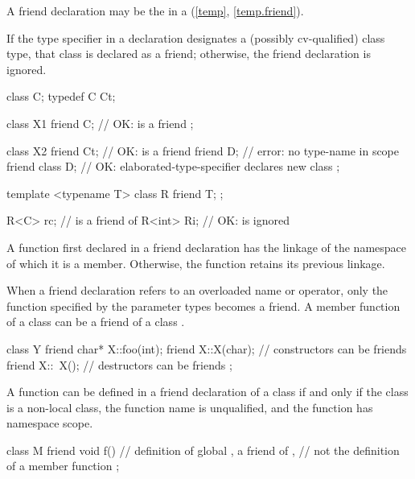 \begin{note}
A friend declaration may be the
 in a 
(\ref{temp}, \ref{temp.friend}).
\end{note}
If the
type specifier in a  declaration designates a (possibly
cv-qualified) class type, that class is declared as a friend; otherwise, the
friend declaration is ignored.
\begin{example}
\begin{codeblock}
class C;
typedef C Ct;

class X1 {
  friend C;                     // OK:  is a friend
};

class X2 {
  friend Ct;                    // OK:  is a friend
  friend D;                     // error: no type-name  in scope
  friend class D;               // OK: elaborated-type-specifier declares new class
};

template <typename T> class R {
  friend T;
};

R<C> rc;                        //  is a friend of 
R<int> Ri;                      // OK:  is ignored
\end{codeblock}
\end{example}

\pnum
{}%
A function first declared in a friend declaration
has the linkage of the namespace of which it is a member.
Otherwise, the function retains its previous linkage.

\pnum
{}%
When a friend
declaration refers to an overloaded name or operator, only the function specified
by the parameter types becomes a friend.
A member function of a class
can be a friend of
a class
.
%
\begin{example}
\begin{codeblock}
class Y {
  friend char* X::foo(int);
  friend X::X(char);            // constructors can be friends
  friend X::~X();               // destructors can be friends
};
\end{codeblock}
\end{example}

\pnum
{}%
A function can be defined in a friend declaration of a class if and only if the
class is a non-local class, the function name is unqualified,
and the function has namespace scope.
\begin{example}
\begin{codeblock}
class M {
  friend void f() { }           // definition of global , a friend of ,
                                // not the definition of a member function
};
\end{codeblock}
\end{example}

